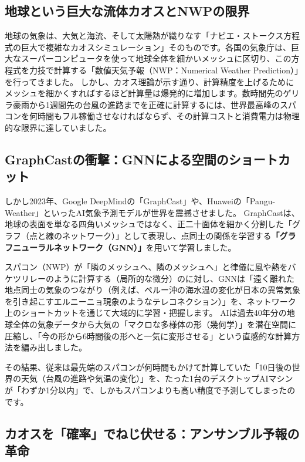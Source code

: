 \subsection{地球という巨大な流体カオスとNWPの限界}

地球の気象は、大気と海流、そして太陽熱が織りなす「ナビエ・ストークス方程式の巨大で複雑なカオスシミュレーション」そのものです。各国の気象庁は、巨大なスーパーコンピュータを使って地球全体を細かいメッシュに区切り、この方程式を力技で計算する「数値天気予報（NWP：Numerical Weather Prediction）」を行ってきました。 しかし、カオス理論が示す通り、計算精度を上げるためにメッシュを細かくすればするほど計算量は爆発的に増加します。数時間先のゲリラ豪雨から1週間先の台風の進路までを正確に計算するには、世界最高峰のスパコンを何時間もフル稼働させなければならず、その計算コストと消費電力は物理的な限界に達していました。

\subsection{GraphCastの衝撃：GNNによる空間のショートカット}

しかし2023年、Google DeepMindの「GraphCast」や、Huaweiの「Pangu-Weather」といったAI気象予測モデルが世界を震撼させました。 GraphCastは、地球の表面を単なる四角いメッシュではなく、正二十面体を細かく分割した「グラフ（点と線のネットワーク）」として表現し、点同士の関係を学習する\textbf{「グラフニューラルネットワーク（GNN）」}を用いて学習しました。

スパコン（NWP）が「隣のメッシュへ、隣のメッシュへ」と律儀に風や熱をバケツリレーのように計算する（局所的な微分）のに対し、GNNは「遠く離れた地点同士の気象のつながり（例えば、ペルー沖の海水温の変化が日本の異常気象を引き起こすエルニーニョ現象のようなテレコネクション）」を、ネットワーク上のショートカットを通じて大域的に学習・把握します。 AIは過去40年分の地球全体の気象データから大気の「マクロな多様体の形（幾何学）」を潜在空間に圧縮し、「今の形から6時間後の形へと一気に変形させる」という直感的な計算方法を編み出しました。

その結果、従来は最先端のスパコンが何時間もかけて計算していた「10日後の世界の天気（台風の進路や気温の変化）」を、たった1台のデスクトップAIマシンが「わずか1分以内」で、しかもスパコンよりも高い精度で予測してしまったのです。

\subsection{カオスを「確率」でねじ伏せる：アンサンブル予報の革命}

